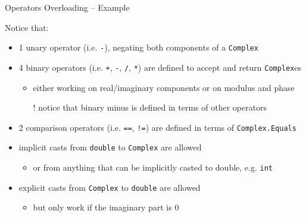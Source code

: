 \documentclass[presentation]{beamer}
\begin{document}
\begin{frame}[allowframebreaks]{Operators Overloading -- Example}
  
  \framebreak

  Notice that:
  \begin{itemize}
    \item 1 unary operator (i.e. \texttt{-}), negating both components of a \texttt{Complex}
    \item 4 binary operators (i.e. \texttt{+}, \texttt{-}, \texttt{/}, \texttt{*}) are defined to accept and return \texttt{Complex}es
    \begin{itemize}
      \item either working on real/imaginary components or on modulus and phase
      \item[!] notice that binary minus is defined in terms of other operators
    \end{itemize}
    \item 2 comparison operators (i.e. \texttt{==}, \texttt{!=}) are defined in terms of \texttt{Complex.Equals}
    \item implicit casts from \texttt{double} to \texttt{Complex} are allowed
    \begin{itemize}
      \item or from anything that can be implicitly casted to double, e.g. \texttt{int}
    \end{itemize}
    \item explicit casts from \texttt{Complex} to \texttt{double} are allowed
    \begin{itemize}
      \item but only work if the imaginary part is 0
    \end{itemize}
  \end{itemize}

\end{frame}
\end{document}

